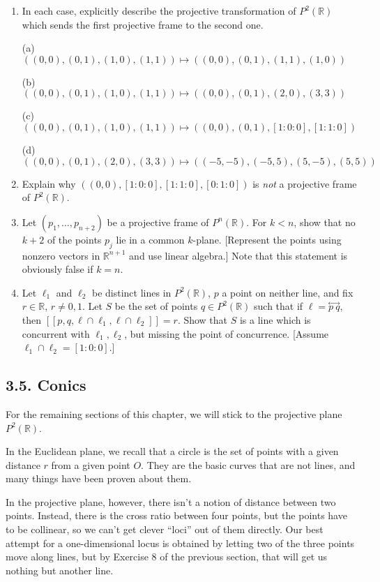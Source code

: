 \documentclass[leqno]{book}
\begin{document}
\begin{enumerate}
(g) $((0,0),(0,1),[1:0:0],[1:1:0])$

\item In each case, explicitly describe the projective transformation of $P^2(\mathbb R)$ which sends the first projective frame to the second one.

(a) $((0,0),(0,1),(1,0),(1,1)) \mapsto ((0,0),(0,1),(1,1),(1,0))$

(b) $((0,0),(0,1),(1,0),(1,1)) \mapsto ((0,0),(0,1),(2,0),(3,3))$

(c) $((0,0),(0,1),(1,0),(1,1)) \mapsto ((0,0),(0,1),[1:0:0],[1:1:0])$

(d) $((0,0),(0,1),(2,0),(3,3)) \mapsto ((-5,-5),(-5,5),(5,-5),(5,5))$

\item Explain why $((0,0),[1:0:0],[1:1:0],[0:1:0])$ is \emph{not} a projective frame of $P^2(\mathbb R)$.

\item Let $(p_1,\dots,p_{n+2})$ be a projective frame of $P^n(\mathbb R)$.  For $k<n$, show that no $k+2$ of the points $p_j$ lie in a common $k$-plane.  [Represent the points using nonzero vectors in $\mathbb R^{n+1}$ and use linear algebra.]  Note that this statement is obviously false if $k=n$.

\item Let $\ell_1$ and $\ell_2$ be distinct lines in $P^2(\mathbb R)$, $p$ a point on neither line, and fix $r\in\mathbb R$, $r\ne 0,1$.  Let $S$ be the set of points $q\in P^2(\mathbb R)$ such that if $\ell=\overset{\longleftrightarrow}{p~q}$, then $[\![p,q,\ell\cap\ell_1,\ell\cap\ell_2]\!]=r$.  Show that $S$ is a line which is concurrent with $\ell_1,\ell_2$, but missing the point of concurrence.  [Assume $\ell_1\cap\ell_2=[1:0:0]$.]
\end{enumerate}

\subsection*{3.5. Conics}
For the remaining sections of this chapter, we will stick to the projective plane $P^2(\mathbb R)$.

In the Euclidean plane, we recall that a circle is the set of points with a given distance $r$ from a given point $O$.  They are the basic curves that are not lines, and many things have been proven about them.

In the projective plane, however, there isn't a notion of distance between two points.  Instead, there is the cross ratio between four points, but the points have to be collinear, so we can't get clever ``loci'' out of them directly.  Our best attempt for a one-dimensional locus is obtained by letting two of the three points move along lines, but by Exercise 8 of the previous section, that will get us nothing but another line.
\end{document}
